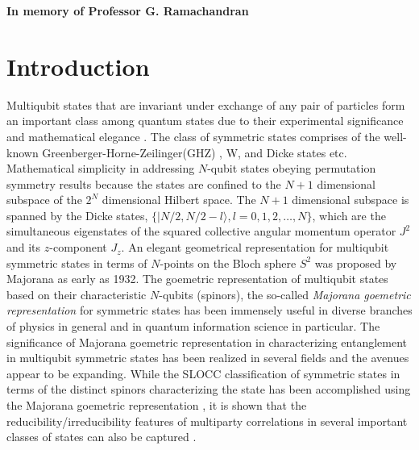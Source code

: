 \begin{center}
\textbf{\Large In memory of Professor G. Ramachandran}
\end{center}

\renewcommand{\thesection}{\Roman{section}}
\section{Introduction}\label{chap29-sec1}

Multiqubit states that are invariant under exchange of any pair of particles form an important class among quantum states due to their experimental significance and mathematical elegance \cite{sym1,sym1a,sym1b,sym2,sym3}. The class of symmetric states comprises of the well-known Greenberger-Horne-Zeilinger(GHZ) \cite{ghz}, W, and Dicke states \cite{dicke} etc. Mathematical simplicity in addressing $N$-qubit  states obeying permutation symmetry results because the states are confined to the $N+1$ dimensional subspace of the $2^N$ dimensional Hilbert space. The $N+1$ dimensional subspace is spanned by the Dicke states, $\{\vert N/2, N/2-l\rangle,  l=0,1,2,\ldots,N\}$, which are the simultaneous eigenstates of the squared collective angular momentum operator $J^2$ and its $z$-component $J_z$. An elegant geometrical representation for  multiqubit symmetric states in terms of $N$-points on the Bloch sphere $S^2$ was proposed by Majorana \cite{majorana} as early as 1932. The goemetric representation of multiqubit states based on their characteristic $N$-qubits (spinors), the so-called {\em Majorana goemetric representation} for symmetric states \cite{majorana,1945,makela} has been  immensely useful in diverse branches of physics \cite{1945,jpa4,arxiv4,jpa5,ejtp6} in general and in quantum information science \cite{solano, mixed, usa, usa1,usa2,markham1,markham2,gebastin,markham3} in particular.  The significance of Majorana goemetric representation in characterizing entanglement in multiqubit symmetric states has been realized in several fields and the avenues appear to be expanding. While the SLOCC classification of symmetric states in terms of the distinct spinors characterizing the state has been accomplished using the Majorana goemetric representation \cite{solano, mixed}, it is shown that the reducibility/irreducibility features of multiparty correlations in several important classes of states can also be captured \cite{usa1,usa2,usa}. 

